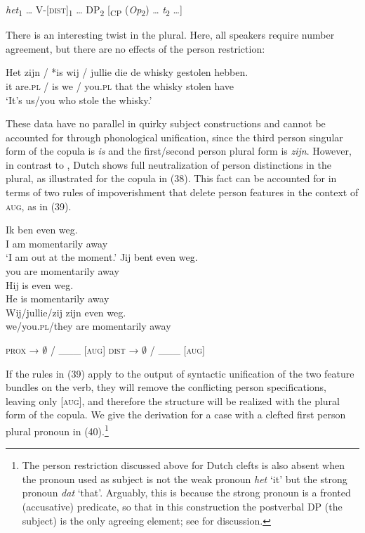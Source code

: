 \documentclass[output=paper]{langsci/langscibook}
\begin{document}
\ea 
 \textit{het}\textsubscript{1} … V-[\textsc{dist}]\textsubscript{1} … DP\textsubscript{2} [\textsubscript{CP} (\textit{Op}\textsubscript{2}) … \textit{t}\textsubscript{2} …]
\z

There is an interesting twist in the plural. Here, all speakers require number agreement, but there are no effects of the person restriction:

\ea 
 \gll  Het zijn / *is   wij / jullie  die  de  whisky gestolen hebben.\\
      it    are.\textsc{pl} / is we / you.\textsc{pl} that the whisky stolen     have\\
 \glt    ‘It’s us/you who stole the whisky.’
\z



These data have no parallel in  quirky subject constructions and cannot be accounted for through phonological unification, since the third person singular form of the copula is \textit{is} and the first\slash second person plural form is \textit{zijn}. However, in contrast to , Dutch shows full neutralization of person distinctions in the plural, as illustrated for the copula in (38). This fact can be accounted for in terms of two rules of impoverishment that delete person features in the context of \textsc{aug}, as in (39).

\ea \label{bkm:Ref295574585}  
\ea \gll Ik ben even              weg.\\
    I   am  momentarily away\\
\glt ‘I am out at the moment.’
\ex \gll Jij   bent even              weg.\\
    you are   momentarily away\\
\ex \gll  Hij is even             weg.\\
He is momentarily away\\
\ex \gll  Wij/jullie/zij     zijn even              weg.\\
    we/you.\textsc{pl}/they are   momentarily away\\
\z \z

\ea \label{bkm:Ref328734023}\label{bkm:Ref295642138}  
\ea \textsc{prox} → $\emptyset$ / \_\_\_ [\textsc{aug}]
\ex \textsc{dist} → $\emptyset$ / \_\_\_ [\textsc{aug}]
\z
\z

If the rules in (39) apply to the output of syntactic unification of the two feature bundles on the verb, they will remove the conflicting person specifications, leaving only [\textsc{aug}], and therefore the structure will be realized with the plural form of the copula. We give the derivation for a case with a clefted first person plural pronoun in (40).\footnote{The person restriction discussed above for Dutch clefts is also absent when the pronoun used as subject is not the weak pronoun \textit{het} ‘it’ but the strong pronoun \textit{dat} ‘that’. Arguably, this is because the strong pronoun is a fronted (accusative) predicate, so that in this construction the postverbal DP (the subject) is the only agreeing element; see \citet{Ackema2018} for discussion.}
\end{document}
